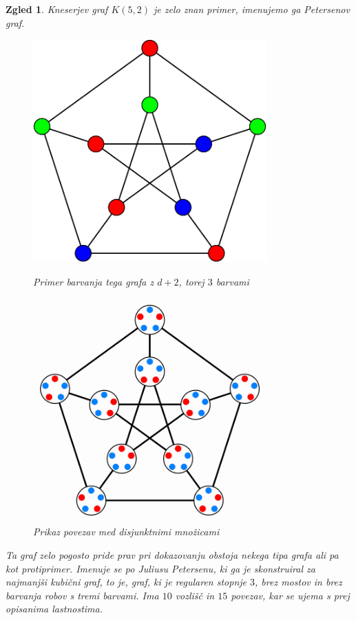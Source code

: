 \documentclass[a4paper,12pt]{article}
\newtheorem{zgled}{Zgled}
\begin{document}
\begin{zgled}{Kneserjev graf $K(5,2)$ je zelo znan primer, imenujemo ga Petersenov graf. 

\begin{figure}[h!]
	\centering
	\begin{minipage}{0.45\textwidth}
		\centering
		\includegraphics[width=0.8\textwidth]{petersenov_graf_barvanje}
        	\caption{Primer barvanja tega grafa z $d+2$, torej $3$ barvami}
    	\end{minipage}\hfill
    	\begin{minipage}{0.45\textwidth}
       	 \centering
        	 \includegraphics[width=0.8\textwidth]{petersenov_graf_mnozice}
       	 \caption{Prikaz povezav med disjunktnimi množicami}
    	\end{minipage}
\end{figure}

Ta graf zelo pogosto pride prav pri dokazovanju obstoja nekega tipa grafa ali pa kot protiprimer. Imenuje se po Juliusu Petersenu, ki ga je skonstruiral za najmanjši kubični graf, to je, graf, ki je regularen stopnje $3$, brez mostov in brez barvanja robov s tremi barvami. Ima $10$ vozlišč in $15$ povezav, kar se ujema s prej opisanima lastnostima.}

\end{zgled}
\end{document}
